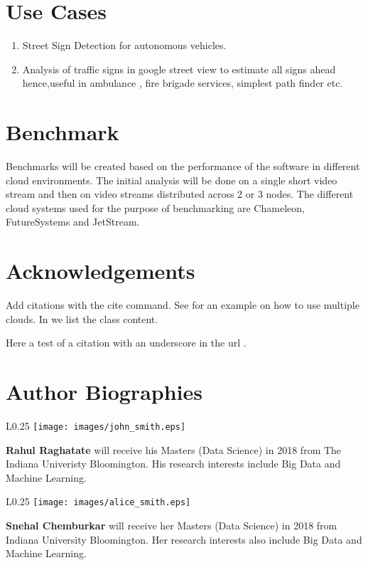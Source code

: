 \documentclass[9pt,twocolumn,twoside]{styles/osajnl}
\begin{document}
\section{Use Cases}
\begin{enumerate}
\item Street Sign Detection for autonomous vehicles.
\item Analysis of traffic signs in google street view to estimate all signs ahead hence,useful in ambulance , fire brigade services, simplest path finder etc.
\end{enumerate}

\section{Benchmark}
Benchmarks will be created based on the performance of the software in different cloud environments. The initial analysis will be done on a single short video stream and then on video streams distributed across 2 or 3 nodes. The different cloud systems used for the purpose of benchmarking are Chameleon, FutureSystems and JetStream.

\section*{Acknowledgements}

\noindent Add citations with the cite command. See
\cite{las14cloudmeshmultiple} for an example on how to use multiple
clouds. In \cite{www-i524} we list the class content.

Here a test of a citation with an underscore in the url \cite{www-underscore}.


 

\section*{Author Biographies}
\begingroup
\setlength\intextsep{0pt}
\begin{minipage}[t][3.2cm][t]{1.0\columnwidth}
  \begin{wrapfigure}{L}{0.25\columnwidth}
    \texttt{[image: images/john\_smith.eps]}
  \end{wrapfigure}
  \noindent
  {\bfseries Rahul Raghatate} will receive his Masters (Data Science) in 2018 from
  The Indiana Univeristy Bloomington. His research interests include Big Data and Machine Learning. 
\end{minipage}
\begin{minipage}[t][3.2cm][t]{1.0\columnwidth} %
  \begin{wrapfigure}{L}{0.25\columnwidth}
    \texttt{[image: images/alice\_smith.eps]}
  \end{wrapfigure}
  \noindent
  {\bfseries Snehal Chemburkar} will receive her Masters (Data Science) in 2018 from
  Indiana University Bloomington. Her research interests also include
  Big Data and Machine Learning. 
\end{minipage}
\endgroup
\end{document}
